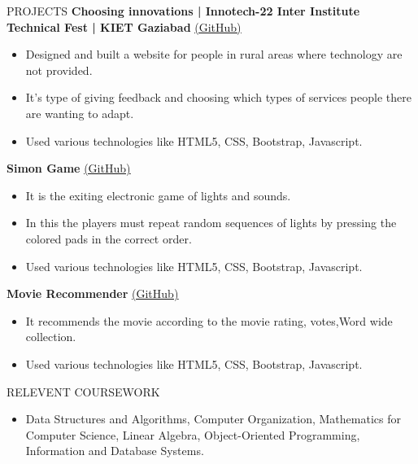 \documentclass{resume} %
\begin{document}
\begin{rSection}{PROJECTS}
\textbf{Choosing innovations | Innotech-22 Inter Institute Technical Fest | KIET Gaziabad} \hfill \href{https://github.com/ayushsachan123}{\underline{(GitHub)}} 
\begin{itemize}
    \item Designed and built a website for people in rural areas where technology are not provided.
    \item It's type of giving feedback and choosing which types of services people there are wanting to adapt.
    \item Used various technologies like HTML5, CSS, Bootstrap, Javascript.
\end{itemize}
\textbf{Simon Game} \hfill \href{https://github.com/ayushsachan123}{\underline{(GitHub)}} 
\begin{itemize}
\item It is the exiting electronic game of lights and sounds.
\item In this the players must repeat random sequences of lights by pressing the colored pads in the correct order.
\item Used various technologies like HTML5, CSS, Bootstrap, Javascript.
\end{itemize}
\textbf{Movie Recommender} \hfill \href{https://github.com/ayushsachan123}{\underline{(GitHub)}}
\begin{itemize} 
    \item It recommends the movie according to the movie rating, votes,Word wide collection.
    \item Used various technologies like HTML5, CSS, Bootstrap, Javascript.
\end{itemize}
\end{rSection} 


\begin{rSection}{RELEVENT COURSEWORK} 
\begin{itemize}
    \item Data Structures and Algorithms, Computer Organization, Mathematics for Computer Science, Linear Algebra, Object-Oriented Programming, Information and Database Systems.
\end{itemize}


\end{rSection}
\end{document}
